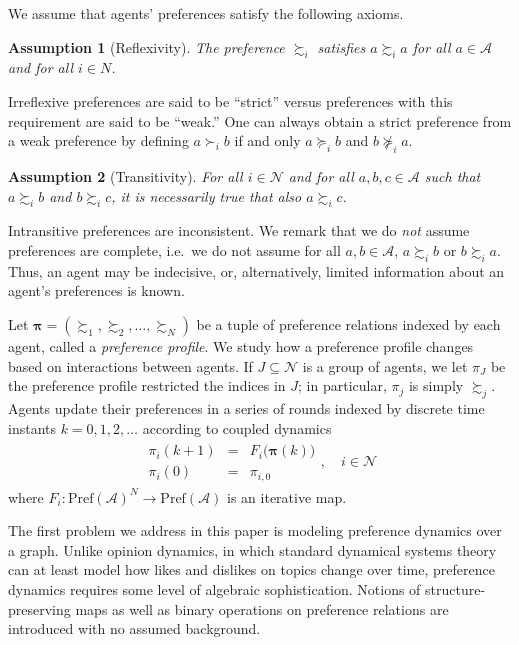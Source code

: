 \documentclass[conference]{ieeeconf}
\newcommand{\N}{\mathcal{N}}
\newcommand{\A}{\mathcal{A}}
\newcommand{\Pref}{\mathrm{Pref}}
\newcommand{\prefers}{\succsim}
\newcommand{\profile}{\boldsymbol{\pi}}
\newtheorem{assumption}{Assumption}
\begin{document}


We assume that agents' preferences satisfy the following axioms.
\begin{assumption}[Reflexivity] \label{ass:reflexivity}
    The preference $\prefers_i$ satisfies $a \prefers_i a$ for all $a \in \A$ and for all $i \in N$.
\end{assumption}

Irreflexive preferences are said to be ``strict'' versus preferences with this requirement are said to be ``weak.'' One can always obtain a strict preference from a weak preference by defining $a \succ_i b$ if and only $a \succeq_i b$ and $b \not\succeq_i a$.

\begin{assumption}[Transitivity]\label{ass:transitivity}
    For all $i \in \N$ and for all $a, b, c \in \A$ such that $a \prefers_i b$ and $b \prefers_i c$, it is necessarily true that also $a \prefers_i c$.
\end{assumption}

Intransitive preferences are inconsistent. We remark that we do \emph{not} assume preferences are complete, i.e.~we do not assume for all $a,b \in \A$, $a \prefers_i b$ or $b \prefers_i a$. Thus, an agent may be indecisive, or, alternatively, limited information about an agent's preferences is known. 

Let $\profile = \left( \prefers_1, \prefers_2, \dots, \prefers_N \right)$ be a tuple of preference relations indexed by each agent, called a \emph{preference profile}. We study how a preference profile changes based on interactions between agents. If $J \subseteq \N$ is a group of agents, we let $\pi_{J}$ be the preference profile restricted the indices in $J$; in particular, $\pi_j$ is simply $\prefers_j$. Agents update their preferences in a series of rounds indexed by discrete time instants $k=0,1,2,\dots$ according to coupled dynamics
\begin{align}
    \begin{aligned}
        \pi_i(k+1) &=& F_i \bigl( \profile(k) \bigr)  \\
        \pi_i(0) &=& \pi_{i,0}
    \end{aligned}, \quad i \in \N
    \label{eq:pi-dynamics}
\end{align}
where $F_i: \Pref(\A)^N \to \Pref(\A)$ is an iterative map.

The first problem we address in this paper is modeling preference dynamics over a graph. Unlike opinion dynamics, in which standard dynamical systems theory can at least model how likes and dislikes on topics change over time, preference dynamics requires some level of algebraic sophistication. Notions of structure-preserving maps as well as binary operations on preference relations are introduced with no assumed background.
\end{document}
